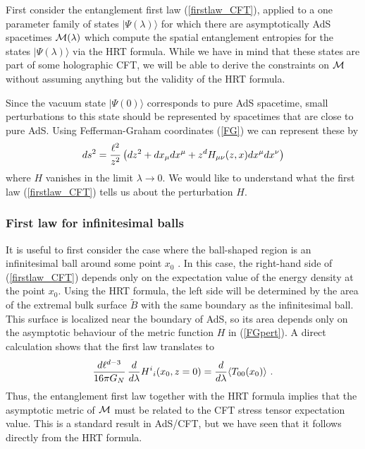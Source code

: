 \documentclass[12pt,epsf]{article}
\newcommand{\be}{\begin{equation}}
\newcommand{\ee}{\end{equation}}
\begin{document}
First consider the entanglement first law (\ref{firstlaw_CFT}), applied to a one parameter family of states $|\Psi(\lambda) \rangle$ for which there are asymptotically AdS spacetimes ${\cal M}(\lambda)$ which compute the spatial entanglement entropies for the states $|\Psi(\lambda) \rangle$ via the HRT formula. While we have in mind that these states are part of some holographic CFT, we will be able to derive the constraints on ${\cal M}$ without assuming anything but the validity of the HRT formula.

Since the vacuum state $|\Psi(0) \rangle$ corresponds to pure AdS spacetime, small perturbations to this state should be represented by spacetimes that are close to pure AdS. Using Fefferman-Graham coordinates (\ref{FG}) we can represent these by
\be
\label{FGpert}
ds^2 = { \ell^2 \over z^2} \left( dz^2 + dx_\mu dx^\mu + z^d H_{\mu \nu}(z,x) dx^\mu dx^\nu \right)
\ee
where $H$ vanishes in the limit $\lambda \to 0$. We would like to understand what the first law (\ref{firstlaw_CFT}) tells us about the perturbation $H$.

\subsubsection*{First law for infinitesimal balls}

It is useful to first consider the case where the ball-shaped region is an infinitesimal ball around some point $x_0$ \cite{faulkner2014gravitation}. In this case, the right-hand side of (\ref{firstlaw_CFT}) depends only on the expectation value of the energy density at the point $x_0$. Using the HRT formula, the left side will be determined by the area of the extremal bulk surface $\tilde{B}$ with the same boundary as the infinitesimal ball. This surface is localized near the boundary of AdS, so its area depends only on the asymptotic behaviour of the metric function $H$ in (\ref{FGpert}). A direct calculation shows that the first law translates to
\be
\label{holoT1}
\frac{d \ell^{d-3}}{16 \pi G_N}\,  {d \over d \lambda} H^{i}{}_{i} (x_0,z=0) =  {d \over d \lambda} \langle T_{00}(x_0) \rangle \ .
\ee
Thus, the entanglement first law together with the HRT formula implies that the asymptotic metric of ${\cal M}$ must be related to the CFT stress tensor expectation value. This is a standard result in AdS/CFT, but we have seen that it follows directly from the HRT formula.
\end{document}
